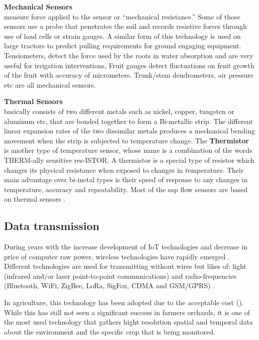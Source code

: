\documentclass[review]{elsarticle}
\begin{document}
    \textbf{Mechanical Sensors} \\measure force applied to the sensor or “mechanical resistance.” Some of those sensors use a probe that penetrates the soil and records resistive forces through use of load cells or strain gauges. A similar form of this technology is used on large tractors to predict pulling requirements for ground engaging equipment. Tensiometers, detect the force used by the roots in water absorption and are very useful for irrigation interventions, Fruit gauges detect fluctuations on fruit growth of the fruit \cite{Brunella_2007} with accuracy of micrometers. Trunk/stem dendrometers, air pressure etc are all mechanical sensors.

    \textbf{Thermal Sensors} \\basically consists of two different metals such as nickel, copper, tungsten or aluminum etc, that are bonded together to form a Bi-metallic strip. The different linear expansion rates of the two dissimilar metals produces a mechanical bending movement when the strip is subjected to temperature change. The \textbf{Thermistor} is another type of temperature sensor, whose name is a combination of the words THERM-ally sensitive res-ISTOR. A thermistor is a special type of resistor which changes its physical resistance when exposed to changes in temperature. Their main advantage over bi-metal types is their speed of response to any changes in temperature, accuracy and repeatability. Most of the sap flow sensors are based on thermal sensors \cite{Alessio_2018}.


    \subsection{Data transmission}
    During years with the increase development of IoT technologies and decrease in price of computer raw power, wireless technologies have rapidly emerged \cite{Zhang2002}. Different technologies are used for transmitting without wires but likes of: light (infrared and/or laser point-to-point communications) and radio-frequencies (Bluetooth, WiFi, ZigBee, LoRa, SigFox, CDMA and GSM/GPRS) \cite{Mirhosseini_2017, Park_2015, Ferentinos_2007}.

    In agriculture, this technology has been adopted due to the acceptable cost (\cite{Vougioukas_2013}). While this has still not seen a significant success in farmers orchards, it is one of the most used technology that gathers hight resolution spatial and temporal data about the environment and the specific crop that is being monitored.
\end{document}
